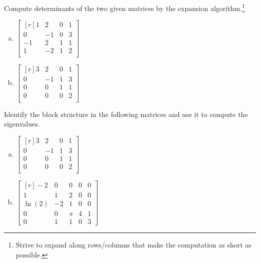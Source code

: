 \begin{question}
  Compute determinants of the two given matrices by the expansion algorithm.\footnote{Strive to expand along rows/columns that make the computation as short as possible.}

  \begin{enumerate}[(a)]
  \item
   \( \begin{bmatrix*}[r]
      1 & 2 & 0 & 1 \\
      0 & -1 & 0 & 3 \\
      -1 & 2 & 1 & 1 \\
      1 & -2 & 1 & 2 \\
    \end{bmatrix*} \)
    \solspace{1.25in}
  \item
   \( \begin{bmatrix*}[r]
      3 & 2 & 0 & 1 \\
      0 & -1 & 1 & 3 \\
      0 & 0 & 1 & 1 \\
      0 & 0 & 0 & 2 \\
    \end{bmatrix*} \)
    \solspace{1.25in}
  \end{enumerate}
\end{question}

\begin{question}
  Identify the block structure in the following matrices and use it to compute the eigenvalues.
  \begin{enumerate}[(a)]
  \item \( \begin{bmatrix*}[r]
      3 & 2 & 0 & 1 \\
      0 & -1 & 1 & 3 \\
      0 & 0 & 1 & 1 \\
      0 & 0 & 0 & 2 \\
    \end{bmatrix*} \)
  \item \(\begin{bmatrix*}[r]
        -2 & 0 & 0 & 0 & 0\\
        1 & 1 & 2 & 0 & 0\\
        \ln(2) & -2 & 1 & 0 & 0\\
        0 & 0 & \pi & 4 & 1\\
        0 & 1 & 1 & 0 & 3
      \end{bmatrix*}\)
      \solspace{1in}
  \end{enumerate}
\end{question}

